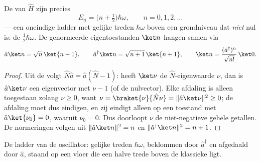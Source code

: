 \begin{theorem}\label{thm:b3:harmonic-oscillator:spectrum}
De  van $\hat H$ zijn precies
\[
E_n = \Big(n + \tfrac12\Big)\hbar\omega , \qquad n = 0, 1, 2, \dots
\]
--- een oneindige ladder met gelijke treden $\hbar\omega$ boven een
grondniveau dat \emph{niet} nul is: de \emph{}
$\tfrac12\hbar\omega$. De genormeerde eigentoestanden $\ket n$ hangen
samen via
\[
\hat a\ket n = \sqrt n\,\ket{n - 1} , \qquad
\hat a^\dagger\ket n = \sqrt{n + 1}\,\ket{n + 1} ,
\qquad
\ket n = \frac{(\hat a^\dagger)^n}{\sqrt{n!}}\,\ket0 .
\]
\end{theorem}

\begin{proof}
Uit de  volgt $\hat N\hat a = \hat a(\hat N - 1)$: heeft
$\ket\nu$ de $\hat N$-eigenwaarde $\nu$, dan is $\hat a\ket\nu$ een
eigenvector met $\nu - 1$ (of de nulvector). Elke afdaling is alleen
toegestaan zolang $\nu \ge 0$, want $\nu = \braket{\nu}{\hat
N\nu} = \|\hat a\ket\nu\|^2 \ge 0$; de afdaling moet dus eindigen, en zij
eindigt alleen op een toestand met $\hat a\ket{\nu_0}
= 0$, waaruit
$\nu_0 = 0$. Dus doorloopt $\nu$ de niet-negatieve gehele getallen. De
normeringen volgen uit $\|\hat a\ket n\|^2 = n$ en $\|\hat a^\dagger\ket n\|^2 = n + 1$.
\end{proof}

\begin{omfigure}

{\small De ladder van de oscillator: gelijke treden $\hbar\omega$,
beklommen door $\hat a^\dagger$ en afgedaald door $\hat a$, staand op een
vloer die een halve trede boven de klassieke  ligt.}
\end{omfigure}

